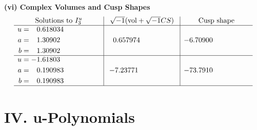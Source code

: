 \documentclass[1p]{elsarticle_modified}
\theoremstyle{definition}
\newcommand{\I}{\sqrt{-1}}
\begin{document}
\newpage\flushleft \textbf{(vi) Complex Volumes and Cusp Shapes}
$$\begin{array}{c|c|c}  
\text{Solutions to }I^u_{3}& \I (\text{vol} + \sqrt{-1}CS) & \text{Cusp shape}\\
 \hline 
\begin{aligned}
u &= \phantom{-}0.618034\phantom{ +0.000000I} \\
a &= \phantom{-}1.30902\phantom{ +0.000000I} \\
b &= \phantom{-}1.30902\phantom{ +0.000000I}\end{aligned}
 & \phantom{-}0.657974\phantom{ +0.000000I} & -6.70900\phantom{ +0.000000I} \\ \hline\begin{aligned}
u &= -1.61803\phantom{ +0.000000I} \\
a &= \phantom{-}0.190983\phantom{ +0.000000I} \\
b &= \phantom{-}0.190983\phantom{ +0.000000I}\end{aligned}
 & -7.23771\phantom{ +0.000000I} & -73.7910\phantom{ +0.000000I}\\
 \hline 
 \end{array}$$\newpage
\newpage\renewcommand{\arraystretch}{1}
\centering \section*{ IV. u-Polynomials}
\end{document}

